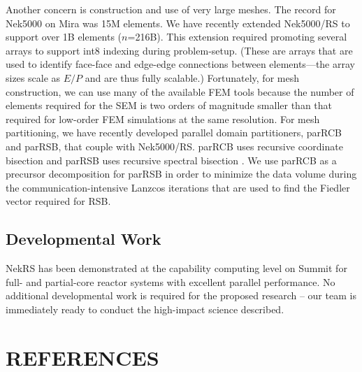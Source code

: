 Another concern is construction and use of very large meshes.  The record
for Nek5000 on Mira was 15M elements.  We have recently extended Nek5000/RS
to support over 1B elements ($n$=216B).   This extension required promoting
several arrays to support int8 indexing during problem-setup.  (These
are arrays that are used to identify face-face and edge-edge connections
between elements---the array sizes scale as $E/P$ and are thus fully
scalable.)   Fortunately, for mesh construction, we can use many of the
available FEM tools because the number of elements required for the SEM
is two orders of magnitude smaller than that required for low-order FEM
simulations at the same resolution.
For mesh partitioning, we have recently developed parallel domain partitioners,
parRCB and parRSB, that couple with Nek5000/RS.  parRCB uses recursive
coordinate bisection and parRSB uses recursive spectral bisection
\cite{pothen90}.  We use parRCB as a precursor decomposition for parRSB in
order to minimize the data volume during the communication-intensive Lanzcos
iterations that are used to find the Fiedler vector required for RSB.



\vspace{-.25in}
\subsection{Developmental Work}
\vspace{-.2in}


NekRS has been demonstrated at the capability computing level on Summit
for full- and partial-core reactor systems with excellent parallel performance.
No additional developmental work is required for the proposed research -- our
team is immediately ready to conduct the high-impact science described.

\clearpage
\vspace{-.15in}
\section{REFERENCES}
\vspace{-.15in}

